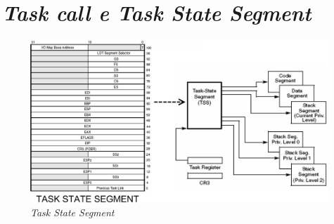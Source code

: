 \section{\textit{Task call e Task State Segment}}
\label{sec:taskGate}

\begin{figure}[!h]
\centering
\includegraphics[width=\columnwidth]{img/TSS}
\caption{\textit{Task State Segment}}
\label{fig:TSS}
\end{figure}

